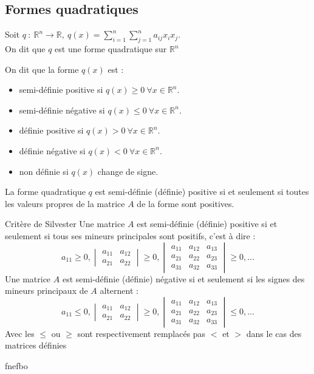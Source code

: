 \subsection{Formes quadratiques}
\begin{defi}
Soit $q\ :\ \mathbb{R}^n\to\mathbb{R},\ q(x)=\sum_{i=1}^n\sum_{j=1}^n a_{ij}x_i x_j$.\\
On dit que $q$ est une forme quadratique sur $\mathbb{R}^n$
\end{defi}
\begin{defi}
On dit que la forme $q(x)$ est :
\begin{itemize}
    \item semi-définie positive si $q(x)\ge 0\ \forall x\in\mathbb{R}^n$.
    \item semi-définie négative si $q(x)\leq 0\ \forall x\in\mathbb{R}^n$.
    \item définie positive si $q(x)> 0\ \forall x\in\mathbb{R}^n$.
    \item définie négative si $q(x)< 0\ \forall x\in\mathbb{R}^n$.
    \item non définie si $q(x)$ change de signe.
\end{itemize}
\end{defi}
\begin{thm}[Proposition]
La forme quadratique $q$ est semi-définie (définie) positive si et seulement si toutes les valeurs propres de la matrice $A$ de la forme sont positives.
\end{thm}
\begin{bclogo}[couleur=green!30,couleurBord=green,logo=\bccle ,ombre=true,arrondi=0.1]{Critère de Silvester}
Une matrice $A$ est semi-définie (définie) positive si et seulement si tous ses mineurs principales sont positifs, c'est à  dire :
$$a_{11}\ge 0, \begin{vmatrix} a_{11}&a_{12}\\ a_{21} & a_{22}\end{vmatrix}\ge 0,\begin{vmatrix}a_{11} & a_{12} & a_{13}\\ a_{21} & a_{22} & a_{23}\\ a_{31} & a_{32} & a_{33}\end{vmatrix}\ge 0, ...$$
Une matrice $A$ est semi-définie (définie) négative si et seulement si les signes des mineurs principaux de $A$ alternent :
$$a_{11}\leq 0, \begin{vmatrix} a_{11}&a_{12}\\ a_{21} & a_{22}\end{vmatrix}\geq 0,\begin{vmatrix}a_{11} & a_{12} & a_{13}\\ a_{21} & a_{22} & a_{23}\\ a_{31} & a_{32} & a_{33}\end{vmatrix}\leq 0, ...$$
Avec les $\leq$ ou $\ge$ sont respectivement remplacés pas $<$ et $>$ dans le cas des matrices définies
\end{bclogo}
\begin{ex}
fnefbo
\end{ex}